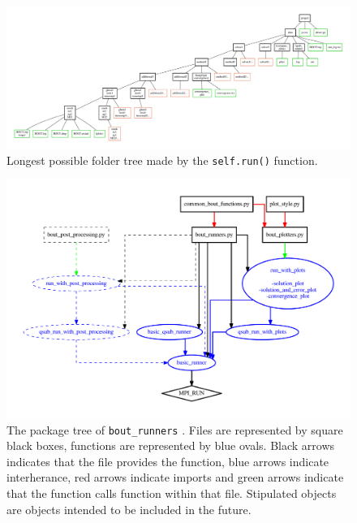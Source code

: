 \documentclass[12pt]{article}
\begin{document}
%
\begin{landscape}
\thispagestyle{empty}
 \vspace*{2cm}
 \begin{figure}[htbp!]
 \hspace*{-4cm}
\centering
\includegraphics[width=1.35\hsize]{figs/folder_tree.pdf}
\caption{Longest possible folder tree made by the
%
\lstinline!self.run()!
%
function.}
%
\label{fig:folder_tree}
%
\end{figure}
%
\end{landscape}
%
\begin{figure}[htbp!]
\centering
\includegraphics[width=0.8\paperwidth]{figs/program_tree.pdf}
\caption{The package tree of
%
\lstinline!bout_runners!
%
. Files are represented by
square black boxes, functions are represented by blue ovals. Black arrows
indicates that the file provides the function, blue arrows indicate
interherance, red arrows indicate imports and green arrows indicate that the
function calls function within that file. Stipulated objects are objects
intended to be included in the future.}
%
\label{fig:program_tree}
%
\end{figure}
%
\printindex
\end{document}
